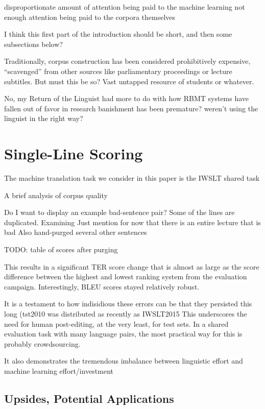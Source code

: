 disproportionate amount of attention being paid to the machine learning
not enough attention being paid to the corpora themselves

I think this first part of the introduction should be short, and then some subsections below?

Traditionally, corpus construction has been considered prohibitively expensive, ``scavenged'' from other sources like parliamentary proceedings or lecture subtitles.
But must this be so? Vast untapped resource of students or whatever.


No, my Return of the Linguist had more to do with how RBMT systems have fallen out of favor in research
banishment has been premature? weren't using the linguist in the right way?


\section{Single-Line Scoring}

The machine translation task we consider in this paper is the IWSLT shared task 

A brief analysis of corpus quality


Do I want to display an example bad-sentence pair? 
Some of the lines are duplicated. Examining 
Just mention for now that there is an entire lecture that is bad
Also hand-purged several other sentences

TODO: table of scores after purging

This results in a significant TER score change that is almost as large as the score difference between the highest and lowest ranking system from the evaluation campaign.  
Interestingly, BLEU scores stayed relatively robust.

It is a testament to how indisidious these errors can be that they persisted this long (tst2010 was distributed as recently as IWSLT2015
This underscores the need for human post-editing, at the very least, for test sets.
In a shared evaluation task with many language pairs, the most practical way for this is probably crowdsourcing.

It also demonstrates the tremendous imbalance between linguistic effort and machine learning effort/investment



\subsection{Upsides, Potential Applications}



